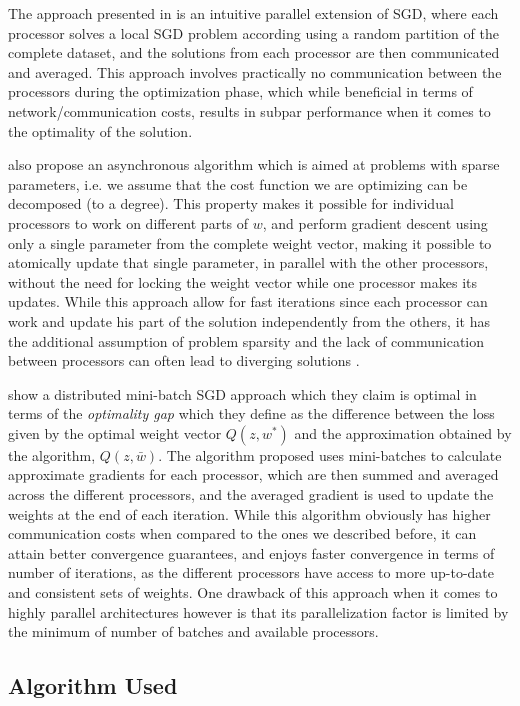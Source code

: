 \documentclass[11pt,a4paper]{article}
\begin{document}
The approach presented in \cite{zinkevich2010parallelized} is an intuitive parallel extension of
SGD, where each processor solves a local SGD problem according using a random partition of the
complete dataset, and the solutions from each processor are then communicated and averaged. This
approach involves practically no communication between the processors during the optimization
phase, which while beneficial in terms of network/communication costs, results in subpar
performance when it comes to the optimality of the solution.

\cite{recht2011hogwild} also propose an asynchronous algorithm which is aimed at problems with
sparse parameters, i.e. we assume that the cost function we are optimizing can be decomposed (to a
degree). This property makes it possible for individual processors to work on different parts of
$w$, and perform gradient descent using only a single parameter from the complete weight vector,
making it possible to atomically update that single parameter, in parallel with the other
processors, without the need for locking the weight vector while one processor makes its updates.
While this approach allow for fast iterations since each processor can work and update his part of
the solution independently from the others, it has the additional assumption of problem sparsity
and the lack of communication between processors can often lead to diverging solutions
\cite{dai2015analysis}.

\cite{dekel2012optimal} show a distributed mini-batch SGD approach which they claim is optimal in
terms of the \textit{optimality gap} which they define as the difference between the loss given by
the optimal weight vector $Q(z, w^*)$ and the approximation obtained by the algorithm, $Q(z,
\bar{w})$. The algorithm proposed uses mini-batches to calculate approximate gradients for each
processor, which are then summed and averaged across the different processors, and the averaged
gradient is used to update the weights at the end of each iteration. While this algorithm obviously
has higher communication costs when compared to the ones we described before, it can attain better
convergence guarantees, and enjoys faster convergence in terms of number of iterations, as the
different processors have access to more up-to-date and consistent sets of weights. One drawback of
this approach when it comes to highly parallel architectures however is that its parallelization
factor is limited by the minimum of number of batches and available processors.

\subsection{Algorithm Used}
\end{document}

